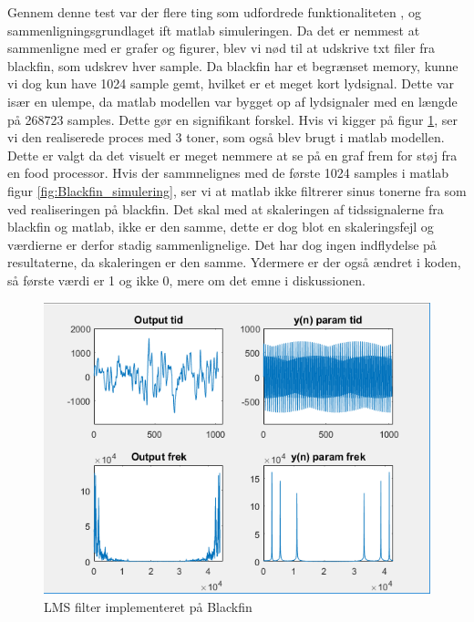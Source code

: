 Gennem denne test var der flere ting som udfordrede funktionaliteten , og sammenligningsgrundlaget ift matlab simuleringen. 
Da det er nemmest at sammenligne med er grafer og figurer, blev vi nød til at udskrive txt filer fra blackfin, som udskrev hver sample. Da blackfin har et begrænset memory, kunne vi dog kun have 1024 sample gemt, hvilket er et meget kort lydsignal. Dette var især en ulempe, da matlab modellen var bygget op af lydsignaler med en længde på 268723 samples. Dette gør en signifikant forskel. 
Hvis vi kigger på figur \ref{fig:Blackfin}, ser vi den realiserede proces med 3 toner, som også blev brugt i matlab modellen. Dette er valgt da det visuelt er meget nemmere at se på en graf frem for støj fra en food processor.
Hvis der sammnelignes med de første 1024 samples i matlab figur \ref{fig:Blackfin_simulering}, ser vi at matlab ikke filtrerer sinus tonerne fra som ved realiseringen på blackfin. Det skal med at skaleringen af tidssignalerne fra blackfin og matlab, ikke er den samme, dette er dog blot en skaleringsfejl og værdierne er derfor stadig sammenlignelige. Det har dog ingen indflydelse på resultaterne, da skaleringen er den samme. Ydermere er der også ændret i koden, så første værdi er 1 og ikke 0, mere om det emne i diskussionen. 
\begin{figure}[H]
	\centering
	\includegraphics[width = 400pt]{Img/Blackfin}
	\caption{LMS filter implementeret på Blackfin}
	\label{fig:Blackfin}
\end{figure}

